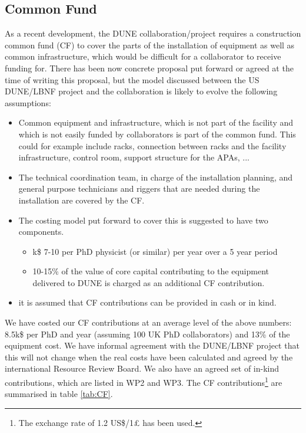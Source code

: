 \subsection{Common Fund}
\label{sec:CF}

As a recent development, the DUNE collaboration/project requires a construction common fund (CF) to cover the parts of the installation of equipment as well as common infrastructure, which would be difficult for a collaborator to receive funding for. There has been now concrete proposal put forward or agreed at the time of writing this proposal, but the model discussed between the US DUNE/LBNF project and the collaboration is likely to evolve the following assumptions:
\begin{itemize}
    \item Common equipment and infrastructure, which is not part of the facility and which is not easily funded by collaborators is part of the common fund. This could for example include racks, connection between racks and the facility infrastructure, control room, support structure for the APAs, ...
    \item The technical coordination team, in charge of the installation planning, and general purpose technicians and riggers that are needed during the installation are covered by the CF.
    \item The costing model put forward to cover this is suggested to have two components.
    \begin{itemize}
        \item k\$ 7-10 per PhD physicist (or similar) per year over a 5 year period
        \item 10-15\% of the value of core capital contributing to the equipment delivered to DUNE is charged as an additional CF contribution.
    \end{itemize}
    \item it is assumed that CF contributions can be provided in cash or in kind.
\end{itemize}
We have costed our CF contributions at an average level of the above numbers: 8.5k\$ per PhD and year (assuming 100 UK PhD collaborators) and 13\% of the equipment cost. We have informal agreement with the DUNE/LBNF project that this will not change when the real costs have been calculated and agreed by the international Resource Review Board. We also have an agreed set of in-kind contributions, which are listed in WP2 and WP3. The CF contributions\footnote{The exchange rate of 1.2 US\$/1£ has been used.} are summarised in table \ref{tab:CF}.  

